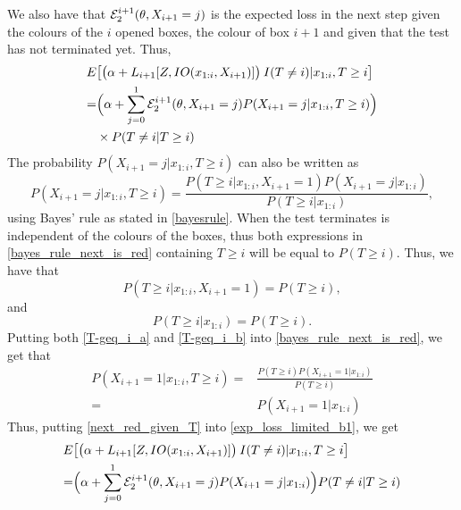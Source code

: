 We also have that $\mathcal{E}^{i+1}_{2}(\theta,X_{i+1}=j)$ is the expected loss in the next step given the colours of the $i$ opened boxes,  the colour of box $i+1$ and given that the test has not terminated yet. Thus,
\begin{equation}
\label{exp_loss_limited_b1}
    \begin{aligned}
        E&\big[\big( \alpha + L_{i+1}[Z,IO(x_{1:i},X_{i+1})] \big) \: I(T\neq i) | x_{1:i}, T\geq i \big] \\
        =& \Big( \alpha + \sum_{j=0}^1 \mathcal{E}^{i+1}_{2}(\theta,X_{i+1}=j) P(X_{i+1}=j|x_{1:i},T\geq i) \Big)\\
        &\times P(T \neq i|T\geq i)
    \end{aligned}
\end{equation}
The probability $P(X_{i+1}=j|x_{1:i},T\geq i)$ can also be written as 
\begin{equation}
\label{bayes_rule_next_is_red}
    P(X_{i+1}=j|x_{1:i},T\geq i) = 
    \frac{P(T\geq i|x_{1:i},X_{i+1}=1)P(X_{i+1}=j|x_{1:i})}{P(T\geq i|x_{1:i})},
\end{equation}
using Bayes' rule as stated in \eqref{bayesrule}.
When the test terminates is independent of the colours of the boxes, thus both expressions in \eqref{bayes_rule_next_is_red} containing $T\geq i$ will be equal to $P(T\geq i)$. Thus, we have that 
\begin{equation}
\label{T-geq_i_a}
    P(T\geq i|x_{1:i},X_{i+1}=1) = P(T\geq i),
\end{equation}
and
\begin{equation}
\label{T-geq_i_b}
    P(T\geq i|x_{1:i}) = P(T\geq i).
\end{equation}
Putting both \eqref{T-geq_i_a} and \eqref{T-geq_i_b} into \eqref{bayes_rule_next_is_red}, we get that
\begin{equation}
\label{next_red_given_T}
    \begin{aligned}
       P(X_{i+1}=1|x_{1:i},T\geq i) 
       =& \frac{P(T\geq i)P(X_{i+1}=1|x_{1:i})}{P(T\geq i)} \\[6pt]
       =& P(X_{i+1}=1|x_{1:i})
    \end{aligned}
\end{equation}
Thus, putting \eqref{next_red_given_T} into \eqref{exp_loss_limited_b1}, we get
\begin{equation}
\label{exp_loss_limited_b}
    \begin{aligned}
        E&\big[\big( \alpha + L_{i+1}[Z,IO(x_{1:i},X_{i+1})] \big) \: I(T\neq i) | x_{1:i}, T\geq i \big] \\
        =& \Big( \alpha + \sum_{j=0}^1 \mathcal{E}^{i+1}_{2}(\theta,X_{i+1}=j) P(X_{i+1}=j|x_{1:i}) \Big) 
        P(T \neq i|T\geq i)
    \end{aligned}
\end{equation}

